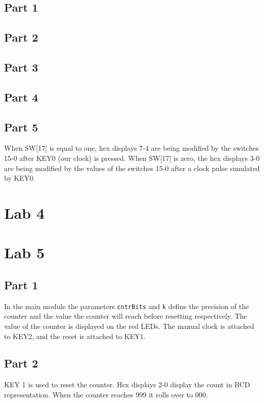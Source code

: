 \documentclass[oneside,letterpaper,12pt,titlepage]{article}
\begin{document}
\subsection{Part 1}

\subsection{Part 2}

\subsection{Part 3}

\subsection{Part 4}

\subsection{Part 5}
When SW[17] is equal to one, hex displays 7-4 are being modified by the switches 15-0 after KEY0 (our clock) is pressed. When SW[17] is zero, the hex displays 3-0 are being modified by the values of the switches 15-0 after a clock pulse simulated by KEY0.

\section{Lab 4}


\section{Lab 5}

\subsection{Part 1}
In the main module the parameters \texttt{cntrBits} and \texttt{k} define the precision of the counter and the value the counter will reach before resetting respectively. The value of the counter is displayed on the red LEDs. The manual clock is attached to KEY2, and the reset is attached to KEY1.

\subsection{Part 2}
KEY 1 is used to reset the counter. Hex displays 2-0 display the count in BCD representation. When the counter reaches 999 it rolls over to 000.
\end{document}
